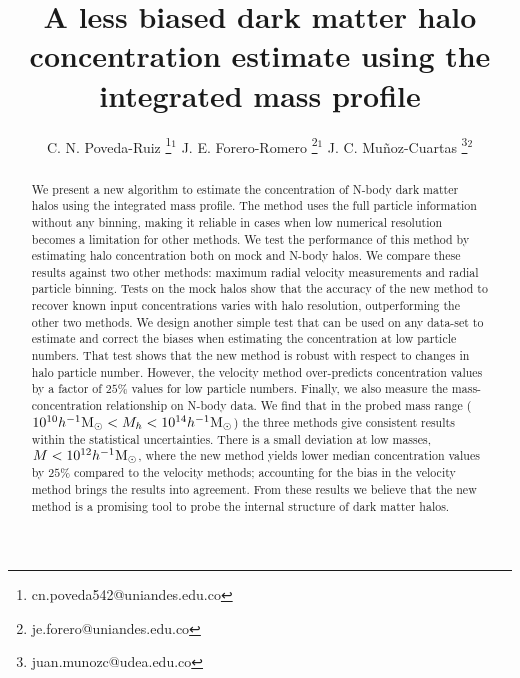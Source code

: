 \documentclass{emulateapj}
\newcommand{\hMsun}{{\ifmmode{h^{-1}{\rm {M_{\odot}}}}\else{$h^{-1}{\rm{M_{\odot}}}$}\fi}}
\begin{document}
\title{A less biased dark matter halo concentration estimate using the integrated mass profile} 
\author{
  C. N. Poveda-Ruiz \thanks{cn.poveda542@uniandes.edu.co}$^{1}$
  J. E. Forero-Romero \thanks{je.forero@uniandes.edu.co}$^{1}$
  J. C. Mu\~noz-Cuartas \thanks{juan.munozc@udea.edu.co}$^{2}$
}




\begin{abstract}
We present a new algorithm to estimate the concentration of N-body
dark matter halos using the integrated mass profile.
The method uses the full particle information without any binning,
making it reliable in cases when low numerical resolution becomes a
limitation for other methods.   
We test the performance of this method by estimating halo
concentration both on mock and N-body halos. 
We compare these results against two other methods:
maximum radial velocity measurements and radial particle binning.
Tests on the mock halos show that the accuracy of the new method to
recover known input concentrations varies with halo resolution,
outperforming the other two methods. 
We design another simple test that can be used on any
data-set to estimate and correct the biases when estimating the
concentration at low particle numbers. 
That test shows that the new method is robust with respect to changes
in halo particle number. 
However, the velocity method over-predicts concentration values by a
factor of $25\%$ values for low particle numbers.
Finally, we also measure the mass-concentration relationship on N-body
data. 
We find that in the probed mass range ($10^{10}\hMsun < M_{h} <
10^{14}\hMsun$) the three methods give consistent results within the
statistical uncertainties.   
There is a small deviation at low masses, $M<10^{12}\hMsun$, where
the new method yields lower median concentration values by $25\%$
compared to the velocity methods; accounting for the bias in the
velocity method brings the results into agreement.  
From these results we believe that the new method is a promising tool
to probe the internal structure of dark matter halos.
\end{abstract}
\end{document}

